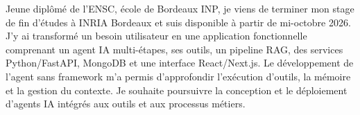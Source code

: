 
\begin{cvparagraph}
Jeune diplômé de l’ENSC, école de Bordeaux INP, je viens de terminer mon stage de fin d’études à INRIA Bordeaux et suis disponible à partir de mi-octobre 2026. J’y ai transformé un besoin utilisateur en une application fonctionnelle comprenant un agent IA multi-étapes, ses outils, un pipeline RAG, des services Python/FastAPI, MongoDB et une interface React/Next.js. Le développement de l’agent sans framework m’a permis d’approfondir l’exécution d’outils, la mémoire et la gestion du contexte. Je souhaite poursuivre la conception et le déploiement d’agents IA intégrés aux outils et aux processus métiers.
\end{cvparagraph}
